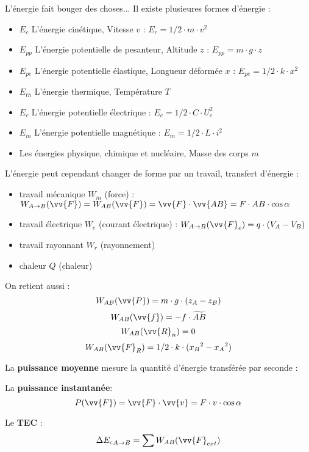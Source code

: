\documentclass[main.tex]{subfiles}
\begin{document}
\begin{Definition}
    L'énergie fait bouger des choses... Il existe plusieures formes d'énergie :
    \begin{itemize}
        \item $E_{c}$ L'énergie cinétique, Vitesse $v$ : $E_{c} = 1/2 \cdot m \cdot v^2 $
        \item $E_{pp}$ L'énergie potentielle de pesanteur, Altitude $z$ : $E_{pp} = m \cdot g \cdot z$
        \item $E_{pe}$ L'énergie potentielle élastique, Longueur déformée $x$ : $E_{pe} = 1/2 \cdot k \cdot x^2$
        \item $E_{th}$ L'énergie thermique, Température $T$ 
        \item $E_{c}$ L'énergie potentielle électrique : $E_{c} = 1/2 \cdot C \cdot U_{c}^2$
        \item $E_{m}$ L'énergie potentielle magnétique : $E_{m} = 1/2 \cdot L \cdot i^2$
        \item Les énergies physique, chimique et nucléaire, Masse des corps $m$
    \end{itemize}

    L'énergie peut cependant changer de forme par un travail, transfert d'énergie :
    \begin{itemize}
        \item travail mécanique $W_{m}$ (force) : $W_{A\rightarrow B}(\vv{F}) = W_{AB}(\vv{F}) = \vv{F}\cdot\vv{AB} = F \cdot AB \cdot \cos{\alpha} $
        \item travail électrique $W_{e}$ (courant électrique) : $W_{A\rightarrow B}(\vv{F}_{e}) = q \cdot (V_{A}-V_{B})$
        \item travail rayonnant $W_{r}$ (rayonnement)
        \item chaleur $Q$ (chaleur)
    \end{itemize}

    On retient aussi :
    $$W_{AB}(\vv{P}) = m\cdot g \cdot (z_{A}-z_{B})$$
    $$W_{AB}(\vv{f}) = - f \cdot \widetilde{AB} $$
    $$W_{AB}(\vv{R}_{n}) = 0$$
    $$W_{AB}(\vv{F}_{R}) = 1/2 \cdot k \cdot ({x_{B}}^2 -{x_{A}}^2)$$

    La \textbf{puissance moyenne} mesure la quantité d'énergie transférée par seconde :


    La \textbf{puissance instantanée}:
    $$P(\vv{F}) = \vv{F}\cdot \vv{v} = F\cdot v \cdot \cos{\alpha}$$

    Le \textbf{TEC} :
    $$\Delta {E_{c}}_{A\rightarrow B} = \sum W_{AB}(\vv{F}_{ext})$$
\end{Definition}
\end{document}
